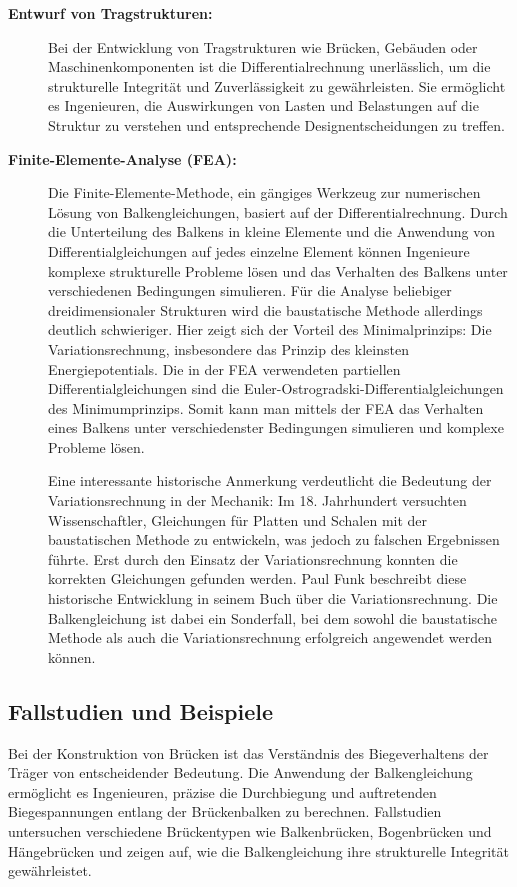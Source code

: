 {\begin{description}
\item[\textbf{Entwurf von Tragstrukturen:}] Bei der Entwicklung von Tragstrukturen wie Brücken, Gebäuden oder Maschinenkomponenten ist die Differentialrechnung unerlässlich, um die strukturelle Integrität und Zuverlässigkeit zu gewährleisten. 
Sie ermöglicht es Ingenieuren, die Auswirkungen von Lasten und Belastungen auf die Struktur zu verstehen und entsprechende Designentscheidungen zu treffen.

\item[\textbf{Finite-Elemente-Analyse (FEA):}] Die Finite-Elemente-Methode, ein gängiges Werkzeug zur numerischen Lösung von Balkengleichungen, basiert auf der Differentialrechnung. 
Durch die Unterteilung des Balkens in kleine Elemente und die Anwendung von Differentialgleichungen auf jedes einzelne Element können Ingenieure komplexe strukturelle Probleme lösen und das Verhalten des Balkens unter verschiedenen Bedingungen simulieren. 
Für die Analyse beliebiger dreidimensionaler Strukturen wird die baustatische Methode allerdings deutlich schwieriger. 
Hier zeigt sich der Vorteil des Minimalprinzips: Die Variationsrechnung, insbesondere das Prinzip des kleinsten Energiepotentials. 
Die in der FEA verwendeten partiellen Differentialgleichungen sind die Euler-Ostrogradski-Differentialgleichungen des Minimumprinzips. 
Somit kann man mittels der FEA das Verhalten eines Balkens unter verschiedenster Bedingungen simulieren und komplexe Probleme lösen.

Eine interessante historische Anmerkung verdeutlicht die Bedeutung der Variationsrechnung in der Mechanik: Im 18. Jahrhundert versuchten Wissenschaftler, Gleichungen für Platten und Schalen mit der baustatischen Methode zu entwickeln, was jedoch zu falschen Ergebnissen führte. 
Erst durch den Einsatz der Variationsrechnung konnten die korrekten Gleichungen gefunden werden. 
Paul Funk beschreibt diese historische Entwicklung in seinem Buch über die Variationsrechnung. 
Die Balkengleichung ist dabei ein Sonderfall, bei dem sowohl die baustatische Methode als auch die Variationsrechnung erfolgreich angewendet werden können. 
\end{description}

\subsection{Fallstudien und Beispiele
\label{Fallstudien und Beispiele}}
Bei der Konstruktion von Brücken ist das Verständnis des Biegeverhaltens der Träger von entscheidender Bedeutung. 
Die Anwendung der Balkengleichung ermöglicht es Ingenieuren, präzise die Durchbiegung und auftretenden Biegespannungen entlang der Brückenbalken zu berechnen. 
Fallstudien untersuchen verschiedene Brückentypen wie Balkenbrücken, Bogenbrücken und Hängebrücken und zeigen auf, wie die Balkengleichung ihre strukturelle Integrität gewährleistet.

}
